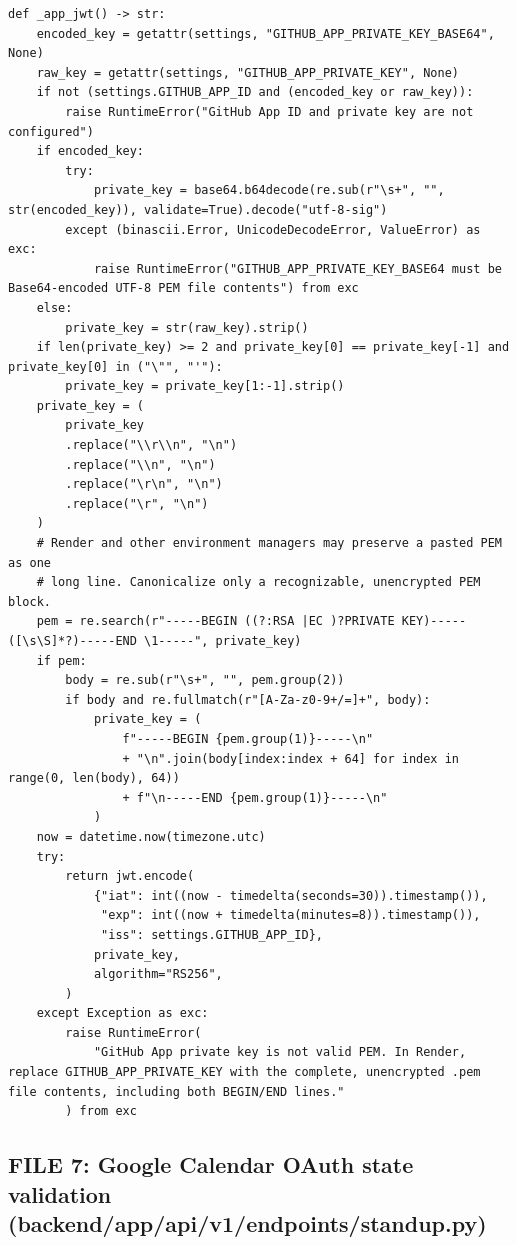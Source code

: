 \documentclass[11pt,a4paper]{article}
\begin{document}
{\begin{lstlisting}[style=python]
def _app_jwt() -> str:
    encoded_key = getattr(settings, "GITHUB_APP_PRIVATE_KEY_BASE64", None)
    raw_key = getattr(settings, "GITHUB_APP_PRIVATE_KEY", None)
    if not (settings.GITHUB_APP_ID and (encoded_key or raw_key)):
        raise RuntimeError("GitHub App ID and private key are not configured")
    if encoded_key:
        try:
            private_key = base64.b64decode(re.sub(r"\s+", "", str(encoded_key)), validate=True).decode("utf-8-sig")
        except (binascii.Error, UnicodeDecodeError, ValueError) as exc:
            raise RuntimeError("GITHUB_APP_PRIVATE_KEY_BASE64 must be Base64-encoded UTF-8 PEM file contents") from exc
    else:
        private_key = str(raw_key).strip()
    if len(private_key) >= 2 and private_key[0] == private_key[-1] and private_key[0] in ("\"", "'"):
        private_key = private_key[1:-1].strip()
    private_key = (
        private_key
        .replace("\\r\\n", "\n")
        .replace("\\n", "\n")
        .replace("\r\n", "\n")
        .replace("\r", "\n")
    )
    # Render and other environment managers may preserve a pasted PEM as one
    # long line. Canonicalize only a recognizable, unencrypted PEM block.
    pem = re.search(r"-----BEGIN ((?:RSA |EC )?PRIVATE KEY)-----([\s\S]*?)-----END \1-----", private_key)
    if pem:
        body = re.sub(r"\s+", "", pem.group(2))
        if body and re.fullmatch(r"[A-Za-z0-9+/=]+", body):
            private_key = (
                f"-----BEGIN {pem.group(1)}-----\n"
                + "\n".join(body[index:index + 64] for index in range(0, len(body), 64))
                + f"\n-----END {pem.group(1)}-----\n"
            )
    now = datetime.now(timezone.utc)
    try:
        return jwt.encode(
            {"iat": int((now - timedelta(seconds=30)).timestamp()),
             "exp": int((now + timedelta(minutes=8)).timestamp()),
             "iss": settings.GITHUB_APP_ID},
            private_key,
            algorithm="RS256",
        )
    except Exception as exc:
        raise RuntimeError(
            "GitHub App private key is not valid PEM. In Render, replace GITHUB_APP_PRIVATE_KEY with the complete, unencrypted .pem file contents, including both BEGIN/END lines."
        ) from exc
\end{lstlisting}

\subsection{FILE 7: Google Calendar OAuth state validation\\(backend/app/api/v1/endpoints/standup.py)}

}
\end{document}
